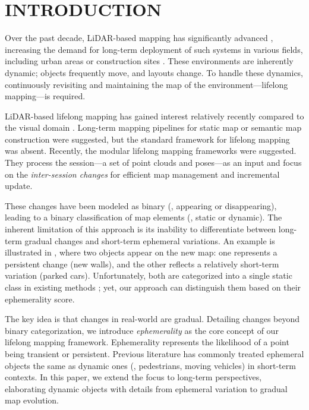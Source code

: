 \section{INTRODUCTION}
\label{sec:intro}

Over the past decade, \ac{LiDAR}-based mapping has significantly advanced \cite{zhang2014loam, shan2018lego, shan2020lio, xu2022fast}, increasing the demand for long-term deployment of such systems in various fields, including urban areas or construction sites \cite{lee2024lidar}. 
These environments are inherently dynamic; objects frequently move, and layouts change. 
To handle these dynamics, continuously revisiting and maintaining the map of the environment---lifelong mapping---is required.

LiDAR-based lifelong mapping has gained interest relatively recently compared to the visual domain \cite{09towards, cramariuc2022maplab, elvira2019orbslam}.
Long-term mapping pipelines for static map \cite{pomerleau2014long} or semantic map \cite{sun2018recurrent} construction were suggested, but the standard framework for lifelong mapping was absent.
Recently, the modular lifelong mapping frameworks \cite{kim2022lt, yang2024lifelong} were suggested. 
They process the session---a set of point clouds and poses---as an input and focus on the \textit{inter-session changes} for efficient map management and incremental update.

These changes have been modeled as binary (\ie, appearing or disappearing), leading to a binary classification of map elements (\ie, static or dynamic). 
The inherent limitation of this approach is its inability to differentiate between long-term gradual changes and short-term ephemeral variations. 
An example is illustrated in , where two objects appear on the new map: one represents a persistent change (new walls), and the other reflects a relatively short-term variation (parked cars).
Unfortunately, both are categorized into a single static class in existing methods \cite{kim2022lt, yang2024lifelong}; yet, our approach can distinguish them based on their ephemerality score. 

The key idea is that changes in real-world are gradual. Detailing changes beyond binary categorization, we introduce \textit{ephemerality} as the core concept of our lifelong mapping framework.
Ephemerality represents the likelihood of a point being transient or persistent. 
Previous literature \cite{09towards, mcmanus2013distraction, barnes2018driven} has commonly treated ephemeral objects the same as dynamic ones (\eg, pedestrians, moving vehicles) in short-term contexts. 
In this paper, we extend the focus to long-term perspectives, elaborating dynamic objects with details from ephemeral variation to gradual map evolution.

